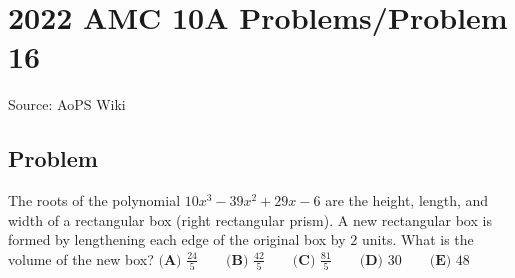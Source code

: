 \documentclass[12pt]{article}
\begin{document}
\section*{{2022 AMC 10A Problems/Problem 16}}
Source: AoPS Wiki

\subsection*{Problem}
The roots of the polynomial $10x^3 - 39x^2 + 29x - 6$ are the height, length, and width of a rectangular box (right rectangular prism). A new rectangular box is formed by lengthening each edge of the original box by $2$ units. What is the volume of the new box? $\textbf{(A) } \frac{24}{5} \qquad \textbf{(B) } \frac{42}{5} \qquad \textbf{(C) } \frac{81}{5} \qquad \textbf{(D) } 30 \qquad \textbf{(E) } 48$
\end{document}
